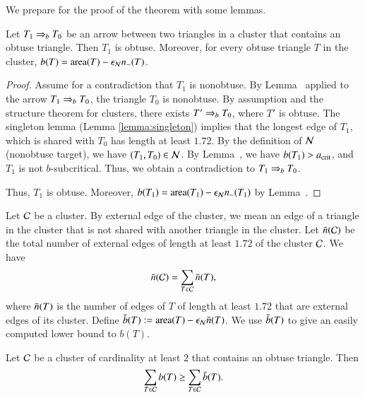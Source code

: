 We prepare for the proof of the theorem with some lemmas.

\begin{lemma} \label{lemma:obtuse-source} 
  Let $T_1\Rightarrow_{b} T_0$ be an
  arrow between two triangles in a cluster that contains an obtuse
  triangle.  Then $T_1$ is obtuse.  Moreover, for every obtuse
  triangle $T$ in the cluster, $b(T) = {\operatorname{area}}(T) -\epsilon_{\mathcal N} n_-(T)$.
\end{lemma}

\begin{proof} 
  Assume for a contradiction that $T_1$ is nonobtuse.  By
  Lemma~ applied to the arrow $T_1\Rightarrow_{b} T_0$, the
  triangle $T_0$ is nonobtuse.  By assumption and the structure
  theorem for clusters, there exists $T'\Rightarrow_{b} T_0$, where $T'$ is
  obtuse.  The singleton lemma (Lemma \ref{lemma:singleton}) implies
  that the longest edge of $T_1$, which is shared with $T_0$ has
  length at least $1.72$.  By the definition of $\mathcal N$ (nonobtuse
  target), we have $(T_1,T_0)\in\mathcal N$.  By Lemma~, we have
  $b(T_1)>a_\text{crit}$, and $T_1$ is not $b$-subcritical.  Thus, we obtain
  a contradiction to $T_1\Rightarrow_{b} T_0$.

 Thus, $T_1$ is obtuse.
  Moreover, $b(T_1) = {\operatorname{area}}(T_1) -\epsilon_{\mathcal N} n_-(T_1)$ by
  Lemma~.
\end{proof}

Let $\mathcal C$ be a cluster.  By external edge of the cluster, we mean an
edge of a triangle in the cluster that is not shared with another
triangle in the cluster.  Let $\bar n(\mathcal C)$ be the total number of
external edges of length at least $1.72$ of the cluster $\mathcal C$.  We have
\[
\bar n(\mathcal C) =\sum_{T\in \mathcal C} \bar n(T),
\]
where $\bar n(T)$ is the number of edges of $T$ of length at least $1.72$
that are external edges of its cluster.
Define $\bar b(T) := {\operatorname{area}}(T)-\epsilon_{\mathcal N}\bar n(T)$.  We use $\bar b(T)$ to give an
easily computed lower bound to $b(T)$.

\begin{lemma} 
  Let $\mathcal C$ be a cluster of cardinality at least $2$ 
  that contains an obtuse triangle.
Then 
\[
\sum_{T\in\mathcal C} b(T)\ge \sum_{T\in\mathcal C} \bar b(T).
\]
\end{lemma}

